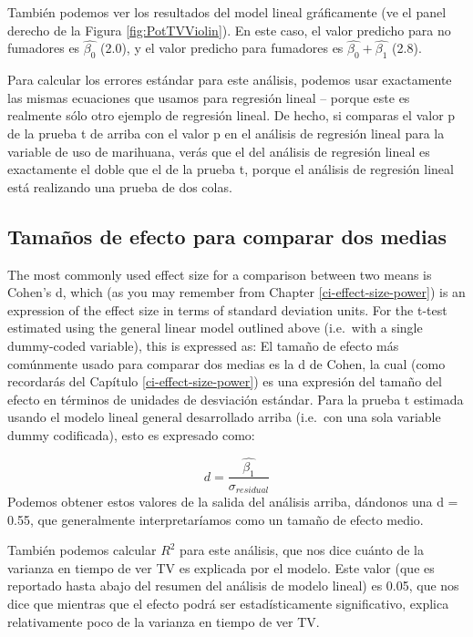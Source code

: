 \documentclass[
  12pt,
]{book}
\theoremstyle{definition}
\theoremstyle{definition}
\theoremstyle{definition}
\theoremstyle{remark}
\begin{document}
También podemos ver los resultados del model lineal gráficamente (ve el panel derecho de la Figura \ref{fig:PotTVViolin}). En este caso, el valor predicho para no fumadores es \(\hat{\beta_0}\) (2.0), y el valor predicho para fumadores es \(\hat{\beta_0} +\hat{\beta_1}\) (2.8).

Para calcular los errores estándar para este análisis, podemos usar exactamente las mismas ecuaciones que usamos para regresión lineal -- porque este es realmente sólo otro ejemplo de regresión lineal. De hecho, si comparas el valor p de la prueba t de arriba con el valor p en el análisis de regresión lineal para la variable de uso de marihuana, verás que el del análisis de regresión lineal es exactamente el doble que el de la prueba t, porque el análisis de regresión lineal está realizando una prueba de dos colas.

\hypertarget{tamauxf1os-de-efecto-para-comparar-dos-medias}{%
\subsection{Tamaños de efecto para comparar dos medias}\label{tamauxf1os-de-efecto-para-comparar-dos-medias}}

The most commonly used effect size for a comparison between two means is Cohen's d, which (as you may remember from Chapter \ref{ci-effect-size-power}) is an expression of the effect size in terms of standard deviation units. For the t-test estimated using the general linear model outlined above (i.e.~with a single dummy-coded variable), this is expressed as:
El tamaño de efecto más comúnmente usado para comparar dos medias es la d de Cohen, la cual (como recordarás del Capítulo \ref{ci-effect-size-power}) es una expresión del tamaño del efecto en términos de unidades de desviación estándar. Para la prueba t estimada usando el modelo lineal general desarrollado arriba (i.e.~con una sola variable dummy codificada), esto es expresado como:

\[
d = \frac{\hat{\beta_1}}{\sigma_{residual}}
\]
Podemos obtener estos valores de la salida del análisis arriba, dándonos una d = 0.55, que generalmente interpretaríamos como un tamaño de efecto medio.

También podemos calcular \(R^2\) para este análisis, que nos dice cuánto de la varianza en tiempo de ver TV es explicada por el modelo. Este valor (que es reportado hasta abajo del resumen del análisis de modelo lineal) es 0.05, que nos dice que mientras que el efecto podrá ser estadísticamente significativo, explica relativamente poco de la varianza en tiempo de ver TV.
\end{document}
